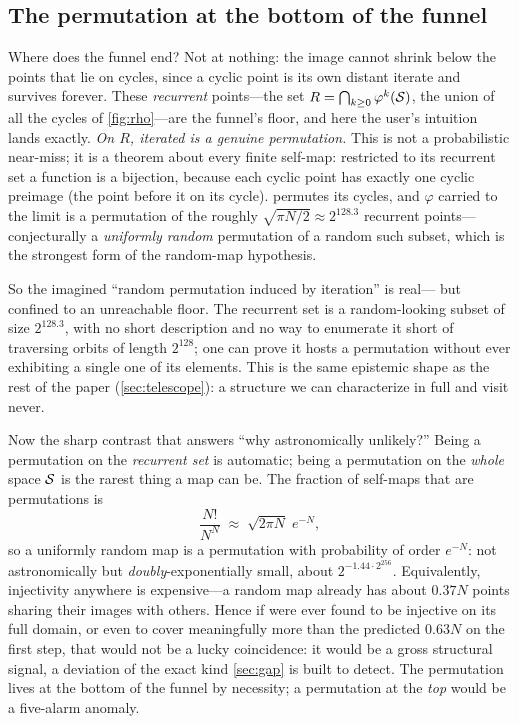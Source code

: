 \subsection{The permutation at the bottom of the funnel}
\label{sec:permutation}

Where does the funnel end? Not at nothing: the image cannot shrink below
the points that lie on cycles, since a cyclic point is its own distant
iterate and survives forever. These \emph{recurrent} points---the set
$R=\bigcap_{k\ge 0}\varphi^{k}(\mathcal{S})$, the union of all the cycles of
\cref{fig:rho}---are the funnel's floor, and here the user's intuition
lands exactly. \emph{On $R$, iterated \SHA{} is a genuine permutation.}
This is not a probabilistic near-miss; it is a theorem about every
finite self-map: restricted to its recurrent set a function is a
bijection, because each cyclic point has exactly one cyclic preimage
(the point before it on its cycle). \SHA{} permutes its cycles, and
$\varphi$ carried to the limit is a permutation of the roughly
$\sqrt{\pi N/2}\approx 2^{128.3}$ recurrent points---conjecturally a
\emph{uniformly random} permutation of a random such subset, which is
the strongest form of the random-map hypothesis.

So the imagined ``random permutation induced by iteration'' is real---%
but confined to an unreachable floor. The recurrent set is a
random-looking subset of size $2^{128.3}$, with no short description and
no way to enumerate it short of traversing orbits of length $2^{128}$;
one can prove it hosts a permutation without ever exhibiting a single
one of its elements. This is the same epistemic shape as the rest of the
paper (\cref{sec:telescope}): a structure we can characterize in full
and visit never.

Now the sharp contrast that answers ``why astronomically unlikely?''
Being a permutation on the \emph{recurrent set} is automatic; being a
permutation on the \emph{whole} space $\mathcal{S}$ is the rarest thing a map
can be. The fraction of self-maps that are permutations is
\[
  \frac{N!}{N^{N}} \;\approx\; \sqrt{2\pi N}\; e^{-N},
\]
so a uniformly random map is a permutation with probability of order
$e^{-N}$: not astronomically but \emph{doubly}-exponentially small, about
$2^{-1.44\cdot 2^{256}}$. Equivalently, injectivity anywhere is
expensive---a random map already has about $0.37 N$ points sharing their
images with others. Hence if \SHA{} were ever found to be injective on
its full domain, or even to cover meaningfully more than the predicted
$0.63N$ on the first step, that would not be a lucky coincidence: it
would be a gross structural signal, a deviation of the exact kind
\cref{sec:gap} is built to detect. The permutation lives at the bottom
of the funnel by necessity; a permutation at the \emph{top} would be a
five-alarm anomaly.

